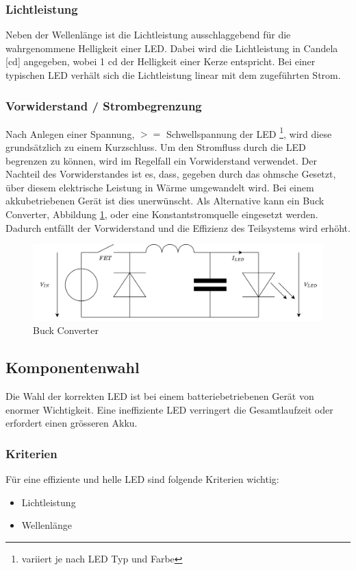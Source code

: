 \documentclass[12pt]{article}
\begin{document}
	\subsubsection*{Lichtleistung}
	Neben der Wellenlänge ist die Lichtleistung ausschlaggebend für die wahr\-genommene Helligkeit einer LED. Dabei wird die Lichtleistung in Candela [cd] angegeben, wobei 1 cd der Helligkeit einer Kerze entspricht. Bei einer typischen LED verhält sich die Lichtleistung linear mit dem zugeführten Strom.
	\subsubsection*{Vorwiderstand / Strombegrenzung} \label{Vorwiderstand}
	Nach Anlegen einer Spannung, $>=$ Schwellspannung der LED \footnote{variiert je nach LED Typ und Farbe}, wird diese grundsätzlich zu einem Kurzschluss. Um den Stromfluss durch die LED begrenzen zu können, wird im Regelfall ein Vorwiderstand verwendet. Der Nachteil des Vorwiderstandes ist es, dass, gegeben durch das ohmsche Gesetzt, über diesem elektrische Leistung in Wärme umgewandelt wird. Bei einem akkubetriebenen Gerät ist dies unerwünscht. Als Alternative kann ein Buck Converter, Abbildung \ref{fig:batbuck-converter}, oder eine Konstantstromquelle eingesetzt werden. Dadurch entfällt der Vorwiderstand und die Effizienz des Teilsystems wird erhöht.
	\begin{figure}[H]
		\centering
		\includegraphics[width=1\linewidth]{images/BAT_Buck-Converter}
		\caption{Buck Converter}
		\label{fig:batbuck-converter}
	\end{figure}
	\subsection{Komponentenwahl}
	Die Wahl der korrekten LED ist bei einem batteriebetriebenen Gerät von enormer Wichtigkeit. Eine ineffiziente LED verringert die Gesamtlaufzeit oder erfordert einen grösseren Akku.
	\subsubsection{Kriterien}
	Für eine effiziente und helle LED sind folgende Kriterien wichtig:
	\begin{itemize}
		\item Lichtleistung 
		\item Wellenlänge
	\end{itemize}
\end{document}
